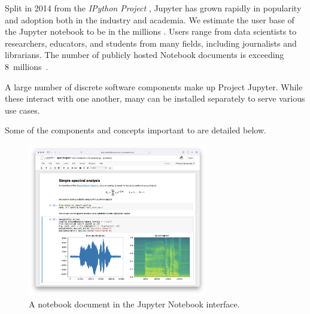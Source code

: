 Split in 2014 from the \emph{IPython Project} \cite{IPython}, Jupyter has grown
rapidly in popularity and adoption both in the industry and academia. We
estimate the user base of the Jupyter notebook to be in the millions
\cite{jupyter-grant}. Users range from data scientists to researchers,
educators, and students from many fields, including journalists and librarians.
The number of publicly hosted Notebook documents is exceeding 8~millions~\cite{notebookcount}.

%

A large number of discrete software components make up Project Jupyter.
While these interact with one another, many can be installed separately
to serve various use cases.


Some of the components and concepts important to \TheProject are detailed below.

\begin{figure}[ht]
  \centering
  \includegraphics[width=0.7\textwidth]{images/spectrogram.png}
  \caption{A notebook document in the Jupyter Notebook interface.}\label{fig:notebook-screenshot}
\end{figure}

